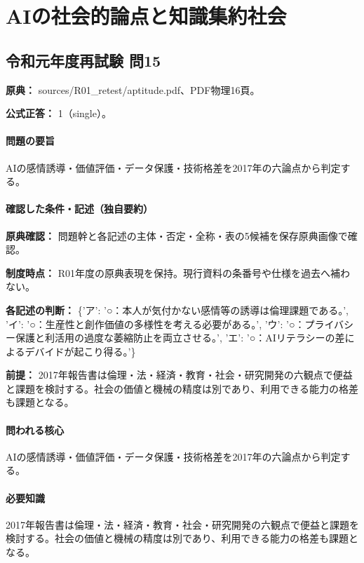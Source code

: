 \section{AIの社会的論点と知識集約社会}

\subsection{令和元年度再試験 問15}
\label{q:r01-ret-apt-15}

\noindent\textbf{原典：} sources/R01\_retest/aptitude.pdf、PDF物理16頁。

\textbf{公式正答：} 1（single）。

\paragraph{問題の要旨} AIの感情誘導・価値評価・データ保護・技術格差を2017年の六論点から判定する。

\paragraph{確認した条件・記述（独自要約）}\mbox{}\par

\noindent\textbf{原典確認：} 問題幹と各記述の主体・否定・全称・表の5候補を保存原典画像で確認。\par

\noindent\textbf{制度時点：} R01年度の原典表現を保持。現行資料の条番号や仕様を過去へ補わない。\par

\noindent\textbf{各記述の判断：} \{'ア': '○：本人が気付かない感情等の誘導は倫理課題である。', 'イ': '○：生産性と創作価値の多様性を考える必要がある。', 'ウ': '○：プライバシー保護と利活用の過度な萎縮防止を両立させる。', 'エ': '○：AIリテラシーの差によるデバイドが起こり得る。'\}\par

\noindent\textbf{前提：} 2017年報告書は倫理・法・経済・教育・社会・研究開発の六観点で便益と課題を検討する。社会の価値と機械の精度は別であり、利用できる能力の格差も課題となる。\par

\paragraph{問われる核心} AIの感情誘導・価値評価・データ保護・技術格差を2017年の六論点から判定する。

\paragraph{必要知識} 2017年報告書は倫理・法・経済・教育・社会・研究開発の六観点で便益と課題を検討する。社会の価値と機械の精度は別であり、利用できる能力の格差も課題となる。

